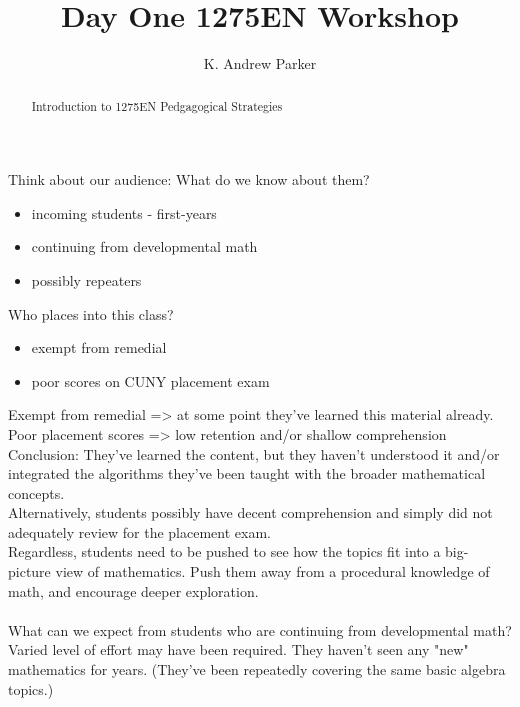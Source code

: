 \documentclass{ximera}
\title{Day One 1275EN Workshop}
\author{K. Andrew Parker}
\begin{document}
\begin{abstract}
Introduction to 1275EN Pedgagogical Strategies
\end{abstract}

\maketitle

Think about our audience: What do we know about them?
\begin{itemize}
\item incoming students - first-years
\item continuing from developmental math
\item possibly repeaters
\end{itemize}

Who places into this class?
\begin{itemize}
\item exempt from remedial
\item poor scores on CUNY placement exam
\end{itemize}

Exempt from remedial => at some point they've learned this material already. \\

Poor placement scores => low retention and/or shallow comprehension \\

Conclusion: They've learned the content, but they haven't understood it
and/or integrated the algorithms they've been taught with the broader
mathematical concepts.\\

Alternatively, students possibly have decent comprehension and simply did not 
adequately review for the placement exam. \\

Regardless, students need to be pushed to see how the topics fit into a big-
picture view of mathematics. Push them away from a procedural knowledge of
math, and encourage deeper exploration.\\

\\

What can we expect from students who are continuing from developmental math? \\

Varied level of effort may have been required. They haven't seen any "new" 
mathematics for years. (They've been repeatedly covering the same basic algebra
topics.)\\
\end{document}
